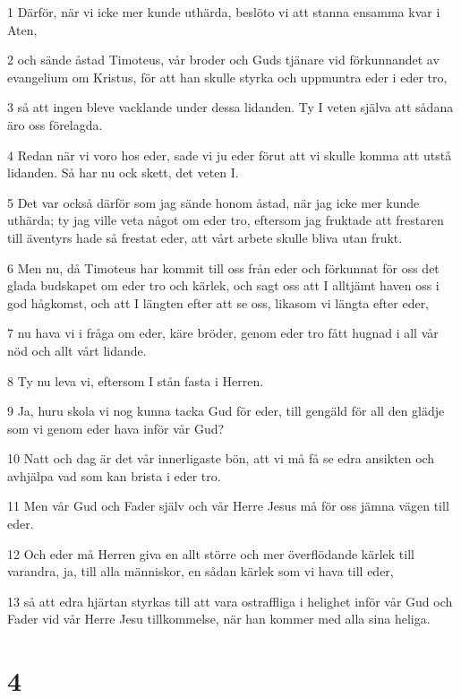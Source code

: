 \par 1 Därför, när vi icke mer kunde uthärda, beslöto vi att stanna ensamma kvar i Aten,
\par 2 och sände åstad Timoteus, vår broder och Guds tjänare vid förkunnandet av evangelium om Kristus, för att han skulle styrka och uppmuntra eder i eder tro,
\par 3 så att ingen bleve vacklande under dessa lidanden. Ty I veten själva att sådana äro oss förelagda.
\par 4 Redan när vi voro hos eder, sade vi ju eder förut att vi skulle komma att utstå lidanden. Så har nu ock skett, det veten I.
\par 5 Det var också därför som jag sände honom åstad, när jag icke mer kunde uthärda; ty jag ville veta något om eder tro, eftersom jag fruktade att frestaren till äventyrs hade så frestat eder, att vårt arbete skulle bliva utan frukt.
\par 6 Men nu, då Timoteus har kommit till oss från eder och förkunnat för oss det glada budskapet om eder tro och kärlek, och sagt oss att I alltjämt haven oss i god hågkomst, och att I längten efter att se oss, likasom vi längta efter eder,
\par 7 nu hava vi i fråga om eder, käre bröder, genom eder tro fått hugnad i all vår nöd och allt vårt lidande.
\par 8 Ty nu leva vi, eftersom I stån fasta i Herren.
\par 9 Ja, huru skola vi nog kunna tacka Gud för eder, till gengäld för all den glädje som vi genom eder hava inför vår Gud?
\par 10 Natt och dag är det vår innerligaste bön, att vi må få se edra ansikten och avhjälpa vad som kan brista i eder tro.
\par 11 Men vår Gud och Fader själv och vår Herre Jesus må för oss jämna vägen till eder.
\par 12 Och eder må Herren giva en allt större och mer överflödande kärlek till varandra, ja, till alla människor, en sådan kärlek som vi hava till eder,
\par 13 så att edra hjärtan styrkas till att vara ostraffliga i helighet inför vår Gud och Fader vid vår Herre Jesu tillkommelse, när han kommer med alla sina heliga.

\chapter{4}

